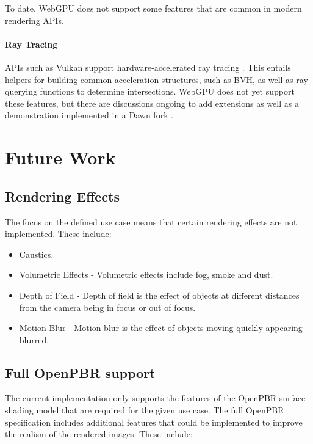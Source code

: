 To date, WebGPU does not support some features that are common in modern rendering APIs.

\paragraph{Ray Tracing}

\glspl{API} such as Vulkan support hardware-accelerated ray tracing \cite{vulkanRayTracing}. This entails helpers for building common acceleration structures, such as \gls{BVH}, as well as ray querying functions to determine intersections. WebGPU does not yet support these features, but there are discussions ongoing to add extensions \cite{webGPURayTracing} as well as a demonstration implemented in a Dawn fork \cite{webGPURayTracingFork}.


\section{Future Work}

\subsection{Rendering Effects}

The focus on the defined use case means that certain rendering effects are not implemented. These include:

\begin{itemize}
    \item{Caustics}.
    \item{Volumetric Effects} - Volumetric effects include fog, smoke and dust.
    \item {Depth of Field} - Depth of field is the effect of objects at different distances from the camera being in focus or out of focus.
    \item {Motion Blur} - Motion blur is the effect of objects moving quickly appearing blurred.
\end{itemize}

\subsection{Full OpenPBR support}

The current implementation only supports the features of the OpenPBR surface shading model that are required for the given use case. The full OpenPBR specification includes additional features that could be implemented to improve the realism of the rendered images. These include:

